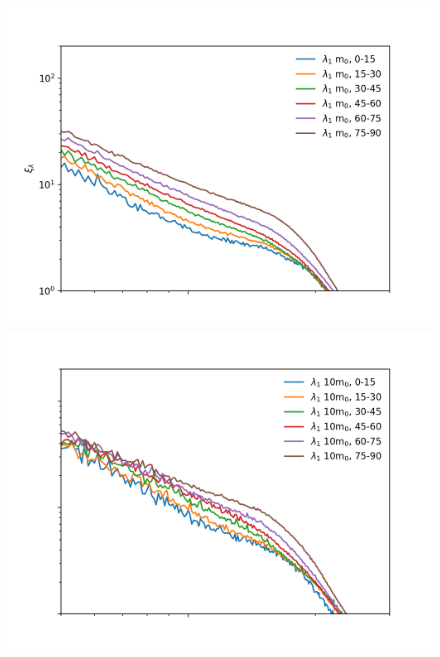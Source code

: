 \documentclass[a4paper,11pt]{article}
\begin{document}
\begin{figure}[!htb]
  \includegraphics[trim={1cm 0 0 0.5cm}, scale=0.57]{aniso_single_light_7_l1.png}
\endminipage\hfill
{}
  \includegraphics[trim={1cm 0 0 0.5cm},scale=0.57]{aniso_single_mid_7_l1.png}
\endminipage\hfill


\end{figure}
\end{document}
